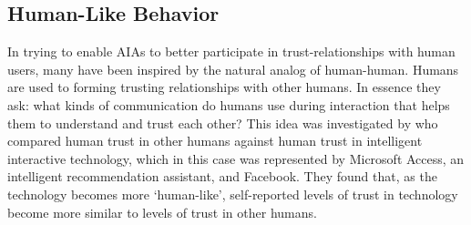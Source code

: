 
\subsection{Human-Like Behavior} \label{sec:human_behavior}
In trying to enable AIAs to better participate in trust-relationships with human users, many have been inspired by the natural analog of human-human. Humans are used to forming trusting relationships with other humans. In essence they ask: what kinds of communication do humans use during interaction that helps them to understand and trust each other? This idea was investigated by \citet{Tripp2011-rx} who compared human trust in other humans against human trust in intelligent interactive technology, which in this case was represented by Microsoft Access, an intelligent recommendation assistant, and Facebook. They found that, as the technology becomes more `human-like', self-reported levels of trust in technology become more similar to levels of trust in other humans.

